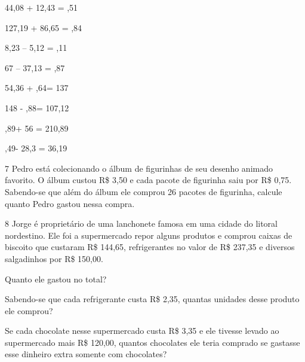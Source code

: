 {\begin{escolha}
\item
  44,08 + 12,43 = ,51\preencher
\item
  127,19 + 86,65 = ,84\preencher
\item
  8,23 -- 5,12 = ,11\preencher
\item
  67 -- 37,13 = ,87\preencher
\item
  54,36 + ,64\preencher = 137
\item
  148 - ,88\preencher = 107,12
\item
  ,89\preencher + 56 = 210,89
\item
  ,49\preencher - 28,3 = 36,19
\end{escolha}


\num{7} Pedro está colecionando o álbum de figurinhas de seu desenho
animado favorito. O álbum custou R\$ 3,50 e cada pacote de figurinha
saiu por R\$ 0,75. Sabendo-se que além do álbum ele comprou 26 pacotes
de figurinha, calcule quanto Pedro gastou nessa compra.



\num{8} Jorge é proprietário de uma lanchonete famosa em uma cidade do
litoral nordestino. Ele foi a supermercado repor alguns produtos e
comprou caixas de biscoito que custaram R\$ 144,65, refrigerantes no
valor de R\$ 237,35 e diversos salgadinhos por R\$ 150,00.

\begin{escolha}
\item
  Quanto ele gastou no total?


\item
  Sabendo-se que cada refrigerante custa R\$ 2,35, quantas unidades
  desse produto ele comprou?


\item
  Se cada chocolate nesse supermercado custa R\$ 3,35 e ele tivesse
  levado ao supermercado mais R\$ 120,00, quantos chocolates ele teria
  comprado se gastasse esse dinheiro extra somente com chocolates?

\end{escolha}


}
